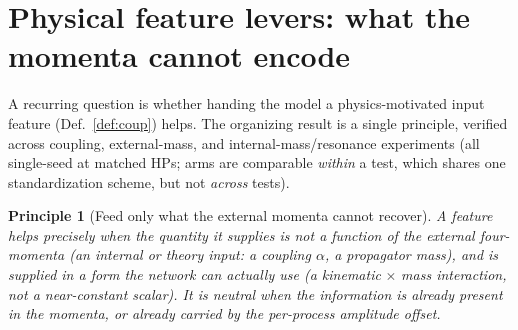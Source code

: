 \documentclass[11pt]{article}
\newtheorem{principle}{Principle}
\begin{document}
\section{Physical feature levers: what the momenta cannot encode}\label{sec:levers}

A recurring question is whether handing the model a physics-motivated input feature
(Def.~\ref{def:coup}) helps. The organizing result is a single principle, verified across
coupling, external-mass, and internal-mass/resonance experiments (all single-seed at matched
HPs; arms are comparable \emph{within} a test, which shares one standardization scheme, but not
\emph{across} tests).

\begin{principle}[Feed only what the external momenta cannot recover]\label{prin:levers}
A feature helps precisely when the quantity it supplies is \emph{not} a function of the
external four-momenta (an internal or theory input: a coupling $\alpha$, a propagator mass),
\emph{and} is supplied in a form the network can actually use (a kinematic$\,\times\,$mass
\emph{interaction}, not a near-constant scalar). It is neutral when the information is already
present in the momenta, or already carried by the per-process amplitude offset.
\end{principle}
\end{document}
